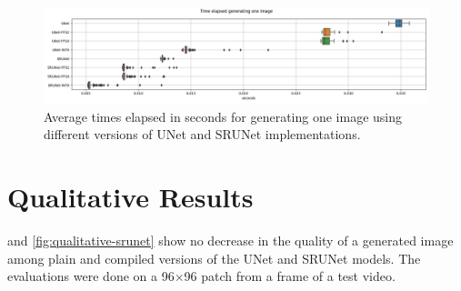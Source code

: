 \begin{figure}[ht]
\includegraphics[width=1.0\textwidth]{static/boxplots_timings.jpg}
\caption{Average times elapsed in seconds for generating one image using different versions of UNet and SRUNet implementations.}
\label{fig:timings}
\end{figure}


\clearpage

\section{Qualitative Results}
\label{sec:qualitative-results}

 and \cref{fig:qualitative-srunet} show no decrease in the quality of a generated image among plain and compiled versions of the UNet and SRUNet models. The evaluations were done on a 96$\times$96 patch from a frame of a test video.

